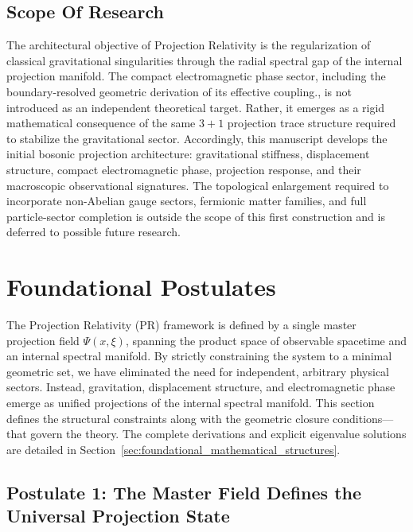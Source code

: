 \documentclass[11pt]{article}
\begin{document}
\subsection{Scope Of Research}
The architectural objective of Projection Relativity is the
regularization of classical gravitational singularities  \cite{Bardeen1968,Hayward2006} through the radial spectral gap of the internal projection manifold. The compact electromagnetic phase sector, including the boundary-resolved geometric derivation of its effective coupling., is not introduced as an independent theoretical target. Rather, it emerges as a rigid mathematical consequence of the same \(3+1\) projection trace structure required to stabilize the gravitational
sector. Accordingly, this manuscript develops the initial bosonic projection
architecture: gravitational stiffness, displacement structure, compact
electromagnetic phase, projection response, and their macroscopic observational signatures. The topological enlargement required to incorporate non-Abelian gauge sectors, fermionic matter families, and full particle-sector completion is outside the scope of this first construction and is deferred to possible future research.


\section{Foundational Postulates}
\label{sec:master_projection_field_foundational_postulates}

The Projection Relativity (PR) framework is defined by a single master projection field $\Psi(x, \xi)$, spanning the product space of observable spacetime and an internal spectral manifold. By strictly constraining the system to a minimal geometric set, we have eliminated the need for independent, arbitrary physical sectors. Instead, gravitation, displacement structure, and electromagnetic phase emerge as unified projections of the internal spectral manifold. This section defines the structural constraints along with the geometric closure conditions—that govern the theory. The complete derivations and explicit eigenvalue solutions are detailed in Section~\ref{sec:foundational_mathematical_structures}.

\subsection{Postulate 1: The Master Field Defines the Universal Projection State}
\label{sec:postulate_master_field_universal_projection_state}
\end{document}
